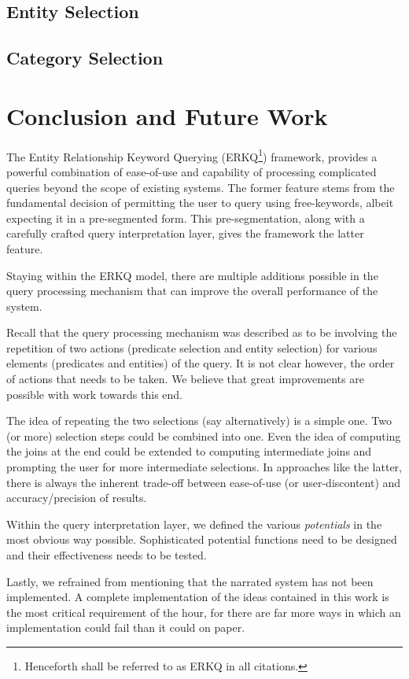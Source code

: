 \documentclass[a4paper, twoside, 12pt]{report}
\begin{document}
\section{Entity Selection}

\section{Category Selection}




\chapter{Conclusion and Future Work}

The Entity Relationship Keyword Querying (ERKQ\footnote{Henceforth shall be referred to as ERKQ in all citations.}) framework, provides a powerful combination of ease-of-use and capability of processing complicated queries beyond the scope of existing systems. The former feature stems from the fundamental decision of permitting the user to query using free-keywords, albeit expecting it in a pre-segmented form. This pre-segmentation, along with a carefully crafted query interpretation layer, gives the framework the latter feature.

Staying within the ERKQ model, there are multiple additions possible in the query processing mechanism that can improve the overall performance of the system.

Recall that the query processing mechanism was described as to be involving the repetition of two actions (predicate selection and entity selection) for various elements (predicates and entities) of the query. It is not clear however, the order of actions that needs to be taken. We believe that great improvements are possible with work towards this end.

The idea of repeating the two selections (say alternatively) is a simple one. Two (or more) selection steps could be combined into one. Even the idea of computing the joins at the end could be extended to computing intermediate joins and prompting the user for more intermediate selections. In approaches like the latter, there is always the inherent trade-off between ease-of-use (or user-discontent) and accuracy/precision of results.

Within the query interpretation layer, we defined the various \emph{potentials} in the most obvious way possible. Sophisticated potential functions need to be designed and their effectiveness needs to be tested.

Lastly, we refrained from mentioning that the narrated system has not been implemented. A complete implementation of the ideas contained in this work is the most critical requirement of the hour, for there are far more ways in which an implementation could fail than it could on paper.



\end{document}
